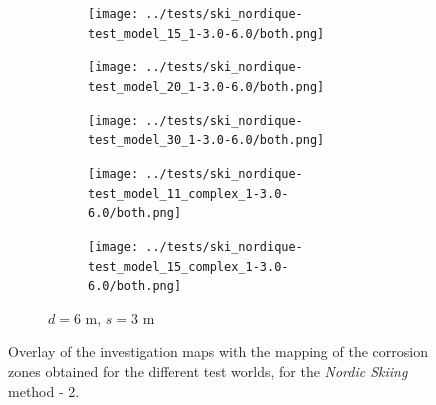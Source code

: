 \begin{theappendices}
\begin{figure}[H]
\begin{subfigure}[t]{\linewidth}
				\hfill
				\begin{subfigure}[t]{0.11\linewidth}
					\texttt{[image: ../tests/ski\_nordique-test\_model\_15\_1-3.0-6.0/both.png]}
				\end{subfigure}
				\hfill
				\begin{subfigure}[t]{0.11\linewidth}
					\texttt{[image: ../tests/ski\_nordique-test\_model\_20\_1-3.0-6.0/both.png]}
				\end{subfigure}
				\hfill
				\begin{subfigure}[t]{0.11\linewidth}
					\texttt{[image: ../tests/ski\_nordique-test\_model\_30\_1-3.0-6.0/both.png]}
				\end{subfigure}
				\hfill
				\begin{subfigure}[t]{0.11\linewidth}
					\texttt{[image: ../tests/ski\_nordique-test\_model\_11\_complex\_1-3.0-6.0/both.png]}
				\end{subfigure}
				\hfill
				\begin{subfigure}[t]{0.11\linewidth}
					\texttt{[image: ../tests/ski\_nordique-test\_model\_15\_complex\_1-3.0-6.0/both.png]}
				\end{subfigure}
				\caption{$d = 6$ m, $s = 3$ m}
			\end{subfigure}
			\caption{Overlay of the investigation maps with the mapping of the corrosion zones obtained for the different test worlds, for the \textit{Nordic Skiing} method - 2.}
			\label{fig:ski_nordique_resultats_2}
		\end{figure}


\end{theappendices}
